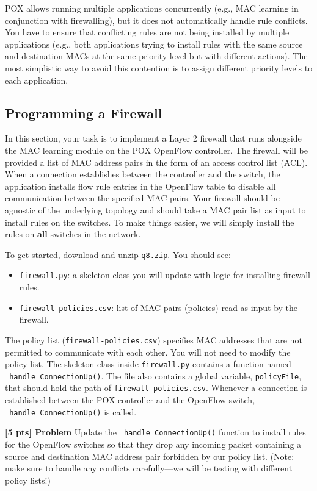 \documentclass{article}
\newcounter{QuestionCounter}
\newcommand{\questionbox}[2]{
\stepcounter{QuestionCounter}
\begin{framed}
\noindent
\textbf{[#1 pts] Problem \arabic{QuestionCounter}}
\vspace{5pt}
\newline
\noindent#2
\end{framed}
}
\begin{document}
POX allows running multiple applications concurrently (e.g., MAC learning in conjunction with firewalling), but it does not automatically handle rule conflicts.
You have to ensure that conflicting rules are not being installed by multiple applications (e.g., both applications trying to install rules with the same source and destination MACs at the same priority level but with different actions).
The most simplistic way to avoid this contention is to assign different priority levels to each application.

\subsection{Programming a Firewall}
In this section, your task is to implement a Layer 2 firewall that runs alongside the MAC learning module on the POX OpenFlow controller.
The firewall will be provided a list of MAC address pairs in the form of an access control list (ACL).
When a connection establishes between the controller and the switch, the application installs flow rule entries in the OpenFlow table to disable all communication between the specified MAC pairs.
Your firewall should be agnostic of the underlying topology and should take a MAC pair list as input to install rules on the switches.
To make things easier, we will simply install the rules on \textbf{all} switches in the network.

\noindent
To get started, download and unzip \texttt{q8.zip}.
You should see:

\begin{itemize}
    \item \texttt{firewall.py}: a skeleton class you will update with logic for installing firewall rules.
    \item \texttt{firewall-policies.csv}: list of MAC pairs (policies) read as input by the firewall.
\end{itemize}

The policy list (\texttt{firewall-policies.csv}) specifies MAC addresses that are not permitted to communicate with each other.
You will not need to modify the policy list.
The skeleton class inside \texttt{firewall.py} contains a function named \texttt{\_handle\_ConnectionUp()}.
The file also contains a global variable, \texttt{policyFile}, that should hold the path of \texttt{firewall-policies.csv}.
Whenever a connection is established between the POX controller and the OpenFlow switch, \texttt{\_handle\_ConnectionUp()} is called.

\questionbox{5}{
Update the \texttt{\_handle\_ConnectionUp()} function to install rules for the OpenFlow switches so that they drop any incoming packet containing a source and destination MAC address pair forbidden by our policy list. (Note: make sure to handle any conflicts carefully---we will be testing with different policy lists!)
}
\end{document}
